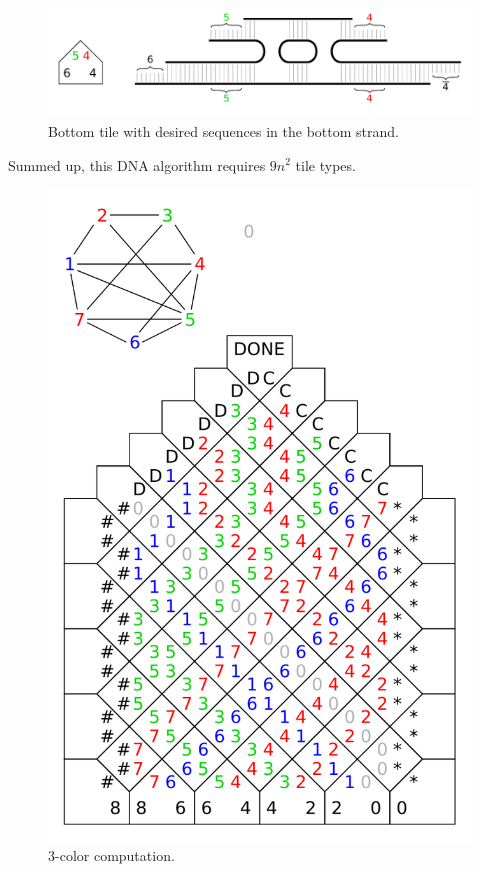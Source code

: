 \begin{figure}[H]
\begin{center}
	\includegraphics[scale=0.75]{./figures/3-color/bottom_tile.pdf}
	\caption{Bottom tile with desired sequences in the bottom strand.}
	\label{fig:bottom_tile}
\end{center}
\end{figure}
Summed up, this DNA algorithm requires $9n^2$ tile types.

\begin{figure}[H]
\begin{center}
	\includegraphics[scale=0.75]{./figures/3-color/3-color.pdf}
	\caption{3-color computation.}
	\label{fig:3-color}
\end{center}
\end{figure}
